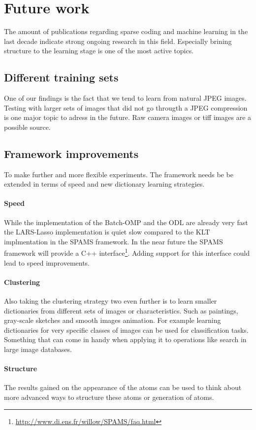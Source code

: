 \section{Future work}
The amount of publications regarding sparse coding and machine learning in the
last decade indicate strong ongoing research in this field. Especially
brining structure to the learning stage is one of the most active topics.

\subsection{Different training sets}
One of our findings is the fact that we tend to learn from natural JPEG images.
Testing with larger sets of images that did not go througth a JPEG compression
is one major topic to adress in the future. Raw camera images or tiff images
are a possible source. 

\subsection{Framework improvements}
To make further and more flexible experiments. The framework needs be be
extended in terms of speed and new dictionary learning strategies.

\paragraph{Speed}
While the implementation of the Batch-OMP and the ODL are already very fast
the LARS-Lasso implementation is quiet slow compared to the KLT implmentation in
the SPAMS framework. In the near future the SPAMS framework will provide a C++
interface\footnote{\url{http://www.di.ens.fr/willow/SPAMS/faq.html}}. Adding
support for this interface could lead to speed improvements.

\paragraph{Clustering}
Also taking the clustering strategy two even further is to learn smaller
dictionaries from different sets of images or characteristics. Such as
paintings, gray-scale sketches and smooth images animation. For example learning
dictionaries for very specific classes of images can be used for classification
tasks. Something that can come in handy when applying it to operations like
search in large image databases.

\paragraph{Structure}
The results gained on the appearance of the atoms can be used to think
about more advanced ways to structure these atoms or generation of atoms.
 

